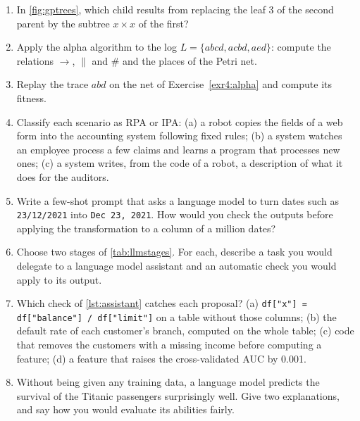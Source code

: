 \begin{enumerate}[label=\textbf{4.\arabic*},ref=4.\arabic*,leftmargin=*,itemsep=6pt]
        \texttt{Ferri, Cesar} $\mapsto$ \texttt{C. Ferri}. Find the four shortest programs consistent with this single
        example and their outputs for \texttt{Garcia Lopez, Juan Jose}.
  \item\label{exr4:cross} In \cref{fig:gptrees}, which child results from replacing the leaf 3 of the second
        parent by the subtree $x\times x$ of the first?
  \item\label{exr4:alpha} Apply the alpha algorithm to the log $L=\{abcd, acbd, aed\}$: compute the
        relations $\rightarrow$, $\parallel$ and $\#$ and the places of the Petri net.
  \item\label{exr4:replay} Replay the trace $abd$ on the net of Exercise~\ref{exr4:alpha} and compute its
        fitness.
  \item\label{exr4:rpa} Classify each scenario as RPA or IPA: (a) a robot copies the fields of a web form
        into the accounting system following fixed rules; (b) a system watches an employee process a few
        claims and learns a program that processes new ones; (c) a system writes, from the code of a robot,
        a description of what it does for the auditors.
  \item\label{exr4:prompt} Write a few-shot prompt that asks a language model to turn dates such as
        \texttt{23/12/2021} into \texttt{Dec 23, 2021}. How would you check the outputs before applying the
        transformation to a column of a million dates?
  \item\label{exr4:llmstage} Choose two stages of \cref{tab:llmstages}. For each, describe a task you would
        delegate to a language model assistant and an automatic check you would apply to its output.
  \item\label{exr4:verify} Which check of \cref{lst:assistant} catches each proposal? (a)
        \texttt{df["x"] = df["balance"] / df["limit"]} on a table without those columns; (b) the default rate of
        each customer's branch, computed on the whole table; (c) code that removes the customers with a missing
        income before computing a feature; (d) a feature that raises the cross-validated AUC by 0.001.
  \item\label{exr4:memorise} Without being given any training data, a language model predicts the survival of the
        Titanic passengers surprisingly well. Give two explanations, and say how you would evaluate its abilities
        fairly.
\end{enumerate}


